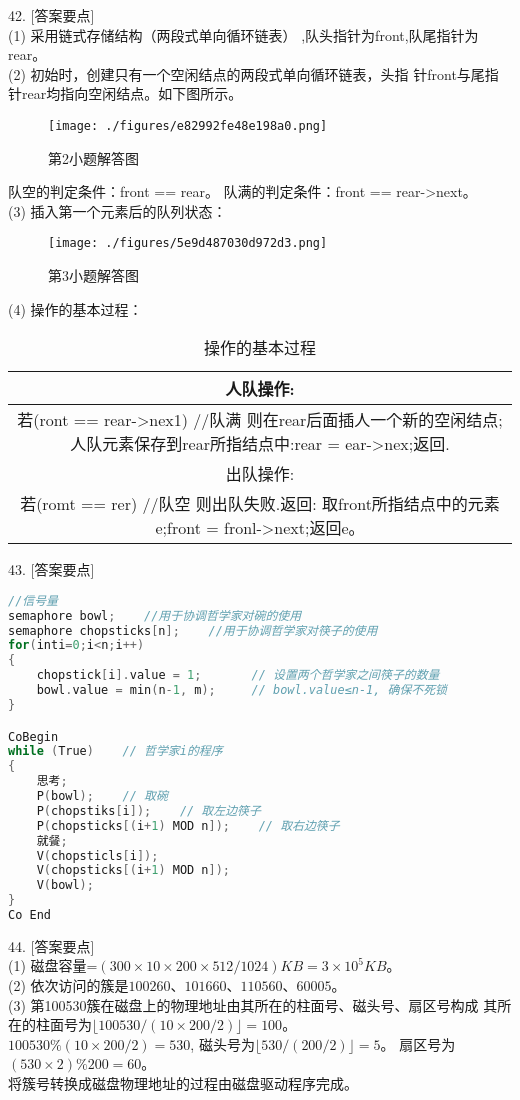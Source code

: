 42. [答案要点] \\
(1) 采用链式存储结构（两段式单向循环链表） ,队头指针为front,队尾指针为rear。 \\
(2) 初始时，创建只有一个空闲结点的两段式单向循环链表，头指
针front与尾指针rear均指向空闲结点。如下图所示。
\begin{figure}[ht]
\centering
\texttt{[image: ./figures/e82992fe48e198a0.png]}
\caption{第2小题解答图} \label{fig_CSN19_4}
\end{figure}
队空的判定条件：front == rear。
队满的判定条件：front == rear->next。 \\
(3) 插入第一个元素后的队列状态：
\begin{figure}[ht]
\centering
\texttt{[image: ./figures/5e9d487030d972d3.png]}
\caption{第3小题解答图} \label{fig_CSN19_5}
\end{figure}
(4) 操作的基本过程： \\
\begin{table}[ht]
\centering
\caption{操作的基本过程}\label{tab_CSN19_1}
\begin{tabular}{|c|}
\hline
人队操作: \\
\hline
若(ront == rear->nex1)    //队满
则在rear后面插人一个新的空闲结点;
人队元素保存到rear所指结点中:rear = ear->nex;返回. \\
\hline
出队操作: \\
\hline
若(romt == rer)    //队空
则出队失败.返回:
取front所指结点中的元素e;front = fronl->next;返回e。 \\
\hline
\end{tabular}
\end{table}

43. [答案要点]
\begin{lstlisting}[language=cpp]
//信号量
semaphore bowl;    //用于协调哲学家对碗的使用
semaphore chopsticks[n];    //用于协调哲学家对筷子的使用
for(inti=0;i<n;i++)
{
    chopstick[i].value = 1;       // 设置两个哲学家之间筷子的数量
    bowl.value = min(n-1, m);     // bowl.value≤n-1, 确保不死锁
}

CoBegin
while (True)    // 哲学家i的程序
{
    思考;
    P(bowl);    // 取碗
    P(chopstiks[i]);    // 取左边筷子
    P(chopsticks[(i+1) MOD n]);    // 取右边筷子
    就餐;
    V(chopsticls[i]);
    V(chopsticks[(i+1) MOD n]);
    V(bowl);
}
Co End
\end{lstlisting}

44. [答案要点] \\
(1) 磁盘容量=$(300\times10\times200\times512/1024)KB=3\times10^5KB$。 \\
(2) 依次访问的簇是$100 260$、$101 660$、$110 560$、$60 005$。 \\
(3) 第100530簇在磁盘上的物理地址由其所在的柱面号、磁头号、扇区号构成
其所在的柱面号为$\lfloor100530/(10\times200/2)\rfloor=100$。 \\
$100530\%(10\times200/2)=530$, 磁头号为$\lfloor530/(200/2)\rfloor=5$。
扇区号为$(530\times2)\%200=60$。 \\
将簇号转换成磁盘物理地址的过程由磁盘驱动程序完成。

